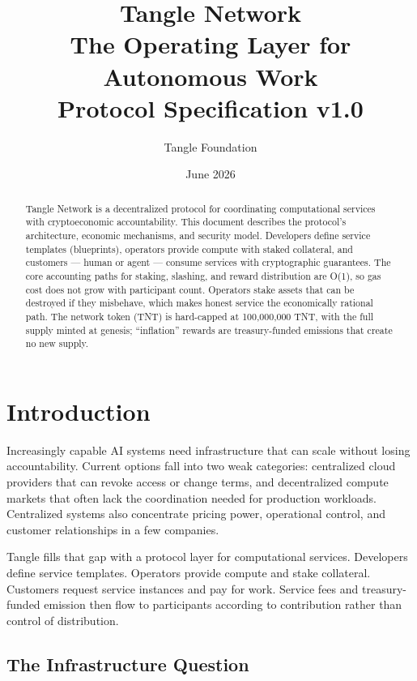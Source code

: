 \documentclass[11pt,a4paper]{article}
\title{\textbf{Tangle Network}\\[0.5em]\large The Operating Layer for Autonomous Work\\[1em]\normalsize Protocol Specification v1.0}
\author{Tangle Foundation}
\date{June 2026}
\begin{document}
\maketitle

\begin{abstract}
Tangle Network is a decentralized protocol for coordinating computational services with cryptoeconomic accountability. This document describes the protocol's architecture, economic mechanisms, and security model. Developers define service templates (blueprints), operators provide compute with staked collateral, and customers --- human or agent --- consume services with cryptographic guarantees. The core accounting paths for staking, slashing, and reward distribution are O(1), so gas cost does not grow with participant count. Operators stake assets that can be destroyed if they misbehave, which makes honest service the economically rational path. The network token (TNT) is hard-capped at 100{,}000{,}000 TNT,
with the full supply minted at genesis; ``inflation'' rewards are treasury-funded emissions that create no new supply.
\end{abstract}

\tableofcontents
\newpage

\section{Introduction}

Increasingly capable AI systems need infrastructure that can scale without losing accountability. Current options fall into two weak categories: centralized cloud providers that can revoke access or change terms, and decentralized compute markets that often lack the coordination needed for production workloads. Centralized systems also concentrate pricing power, operational control, and customer relationships in a few companies.

Tangle fills that gap with a protocol layer for computational services. Developers define service templates. Operators provide compute and stake collateral. Customers request service instances and pay for work. Service fees and treasury-funded emission then flow to participants according to contribution rather than control of distribution.

\subsection{The Infrastructure Question}
\end{document}
